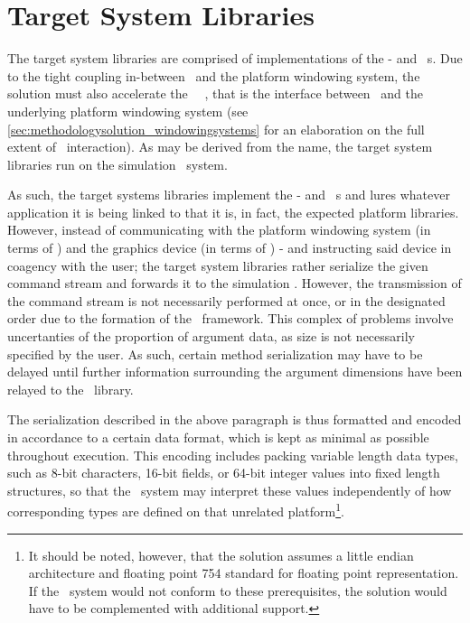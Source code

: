 
\section{Target System Libraries}
\label{sec:methodologysolution_targetsystemlibraries}
The target system libraries are comprised of implementations of the \dvttermegl - and \dvttermopengl\ \dvttermapi s.
Due to the tight coupling in-between \dvttermopengl\ and the platform windowing system, the solution must also accelerate the \dvttermkhronos\ \dvttermegl\ \dvttermapi , that is the interface between \dvttermopengl\ and the underlying platform windowing system (see \ref{sec:methodologysolution_windowingsystems} for an elaboration on the full extent of \dvttermegl\ interaction).
As may be derived from the name, the target system libraries run on the simulation \dvttermtarget\ system.

As such, the target systems libraries implement the \dvttermegl - and \dvttermopenglestwopointo\ \dvttermapi s and lures whatever application it is being linked to that it is, in fact, the expected platform libraries.
However, instead of communicating with the platform windowing system (in terms of \dvttermegl ) and the graphics device (in terms of \dvttermopengl ) - and instructing said device in coagency with the user; the target system libraries rather serialize the given command stream and forwards it to the simulation \dvttermhost .
However, the transmission of the command stream is not necessarily performed at once, or in the designated order due to the formation of the \dvttermopenglestwopointo\ framework.
This complex of problems involve uncertanties of the proportion of argument data, as size is not necessarily specified by the user.
As such, certain method serialization may have to be delayed until further information surrounding the argument	dimensions have been relayed to the \dvttermopengl\ library.

The serialization described in the above paragraph is thus formatted and encoded in accordance to a certain data format, which is kept as minimal as possible throughout execution.
This encoding includes packing variable length data types, such as 8-bit characters, 16-bit fields, or 64-bit integer values into fixed length structures, so that the \dvttermhost\ system may interpret these values independently of how corresponding types are defined on that unrelated platform\footnote{It should be noted, however, that the solution assumes a little endian architecture and floating point 754 standard for floating point representation. If the \dvttermhost\ system would not conform to these prerequisites, the solution would have to be complemented with additional support.}.

